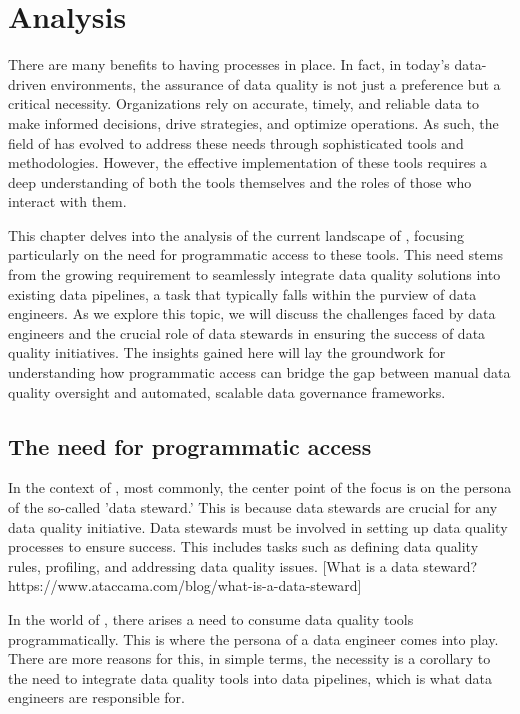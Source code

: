\chapter{Analysis}
There are many benefits to having  processes in place. In fact, in today's data-driven environments, the assurance of data quality is not just a preference but a critical necessity. Organizations rely on accurate, timely, and reliable data to make informed decisions, drive strategies, and optimize operations. As such, the field of  has evolved to address these needs through sophisticated tools and methodologies. However, the effective implementation of these tools requires a deep understanding of both the tools themselves and the roles of those who interact with them.


This chapter delves into the analysis of the current landscape of , focusing particularly on the need for programmatic access to these tools. This need stems from the growing requirement to seamlessly integrate data quality solutions into existing data pipelines, a task that typically falls within the purview of data engineers. As we explore this topic, we will discuss the challenges faced by data engineers and the crucial role of data stewards in ensuring the success of data quality initiatives. The insights gained here will lay the groundwork for understanding how programmatic access can bridge the gap between manual data quality oversight and automated, scalable data governance frameworks.


\section{The need for programmatic access}

In the context of , most commonly, the center point of the focus is on the persona of the so-called 'data steward.' This is because data stewards are crucial
for any data quality initiative. Data stewards must be involved in setting up data quality processes to ensure success. This includes tasks such as defining data quality rules,
profiling, and addressing data quality issues. [What is a data steward? https://www.ataccama.com/blog/what-is-a-data-steward]

In the world of , there arises a need to consume data quality tools programmatically. This is where the persona of a data engineer comes into play. There are more reasons for this, in simple terms,
the necessity is a corollary to the need to integrate data quality tools into data pipelines, which is what data engineers are responsible for.

